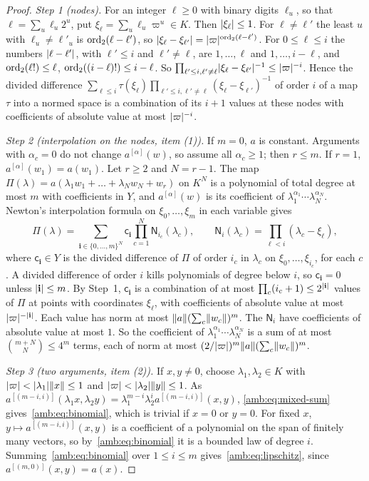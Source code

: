 \begin{proof}
\emph{Step 1 (nodes).} For an integer $\ell\ge0$ with binary digits $\ell_u$, so that $\ell=\sum_u\ell_u2^u$, put $\xi_\ell=\sum_u\ell_u\varpi^u\in K$. Then $\lvert \xi_\ell\rvert\le1$. For $\ell\ne\ell'$ the least $u$ with $\ell_u\ne\ell'_u$ is $\operatorname{ord}_2(\ell-\ell')$, so $\lvert \xi_\ell-\xi_{\ell'}\rvert=\lvert \varpi\rvert^{\operatorname{ord}_2(\ell-\ell')}$. For $0\le\ell\le i$ the numbers $\lvert \ell-\ell'\rvert$, with $\ell'\le i$ and $\ell'\ne\ell$, are $1,\dots,\ell$ and $1,\dots,i-\ell$, and $\operatorname{ord}_2(\ell!)\le\ell$, $\operatorname{ord}_2((i-\ell)!)\le i-\ell$. So $\prod_{\ell'\le i,\ell'\ne\ell}\lvert \xi_\ell-\xi_{\ell'}\rvert^{-1}\le\lvert \varpi\rvert^{-i}$. Hence the divided difference $\sum_{\ell\le i}\tau(\xi_\ell)\prod_{\ell'\le i,\ell'\ne\ell}(\xi_\ell-\xi_{\ell'})^{-1}$ of order $i$ of a map $\tau$ into a normed space is a combination of its $i+1$ values at these nodes with coefficients of absolute value at most $\lvert \varpi\rvert^{-i}$.

\emph{Step 2 (interpolation on the nodes, item (1)).} If $m=0$, $a$ is constant. Arguments with $\alpha_c=0$ do not change $a^{[\alpha]}(w)$, so assume all $\alpha_c\ge1$; then $r\le m$. If $r=1$, $a^{[\alpha]}(w_1)=a(w_1)$. Let $r\ge2$ and $N=r-1$. The map $\Pi(\lambda)=a(\lambda_1w_1+\dots+\lambda_Nw_N+w_r)$ on $K^N$ is a polynomial of total degree at most $m$ with coefficients in $Y$, and $a^{[\alpha]}(w)$ is its coefficient of $\lambda_1^{\alpha_1}\cdots\lambda_N^{\alpha_N}$. Newton's interpolation formula on $\xi_0,\dots,\xi_m$ in each variable gives
\[
 \Pi(\lambda)=\sum_{\mathbf i\in\{0,\dots,m\}^N}\mathsf c_{\mathbf i}\prod_{c=1}^N\mathsf N_{i_c}(\lambda_c),\qquad\mathsf N_i(\lambda_c)=\prod_{\ell<i}(\lambda_c-\xi_\ell),
\]
where $\mathsf c_{\mathbf i}\in Y$ is the divided difference of $\Pi$ of order $i_c$ in $\lambda_c$ on $\xi_0,\dots,\xi_{i_c}$, for each $c$. A divided difference of order $i$ kills polynomials of degree below $i$, so $\mathsf c_{\mathbf i}=0$ unless $\lvert \mathbf i\rvert\le m$. By Step~1, $\mathsf c_{\mathbf i}$ is a combination of at most $\prod_c(i_c+1)\le2^{\lvert \mathbf i\rvert}$ values of $\Pi$ at points with coordinates $\xi_\ell$, with coefficients of absolute value at most $\lvert \varpi\rvert^{-\lvert \mathbf i\rvert}$. Each value has norm at most $\lVert a\rVert(\sum_c\lVert w_c\rVert)^m$. The $\mathsf N_i$ have coefficients of absolute value at most $1$. So the coefficient of $\lambda_1^{\alpha_1}\cdots\lambda_N^{\alpha_N}$ is a sum of at most $\binom{m+N}N\le4^m$ terms, each of norm at most $(2/\lvert \varpi\rvert)^m\lVert a\rVert(\sum_c\lVert w_c\rVert)^m$.

\emph{Step 3 (two arguments, item (2)).} If $x,y\ne0$, choose $\lambda_1,\lambda_2\in K$ with $\lvert \varpi\rvert<\lvert \lambda_1\rvert\lVert x\rVert\le1$ and $\lvert \varpi\rvert<\lvert \lambda_2\rvert\lVert y\rVert\le1$. As $a^{[(m-i,i)]}(\lambda_1x,\lambda_2y)=\lambda_1^{m-i}\lambda_2^ia^{[(m-i,i)]}(x,y)$, \eqref{amb:eq:mixed-sum} gives~\eqref{amb:eq:binomial}, which is trivial if $x=0$ or $y=0$. For fixed $x$, $y\mapsto a^{[(m-i,i)]}(x,y)$ is a coefficient of a polynomial on the span of finitely many vectors, so by~\eqref{amb:eq:binomial} it is a bounded law of degree $i$. Summing~\eqref{amb:eq:binomial} over $1\le i\le m$ gives~\eqref{amb:eq:lipschitz}, since $a^{[(m,0)]}(x,y)=a(x)$.


\end{proof}

